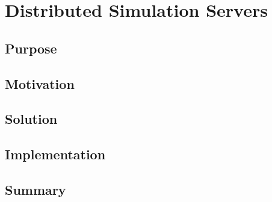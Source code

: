 \chapter{Distributed Simulation Servers}

\section{Purpose}

\section{Motivation}

\section{Solution}

\section{Implementation}

\section{Summary}
